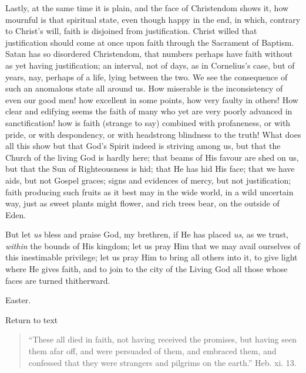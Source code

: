 Lastly, at the same time it is plain, and the face of Christendom
shows it, how mournful is that spiritual state, even though happy in
the end, in which, contrary to Christ's will, faith is disjoined from
justification. Christ willed that justification should come at once
upon faith through the Sacrament of Baptism. Satan has so disordered
Christendom, that numbers perhaps have faith without as yet having
justification; an interval, not of days, as in Cornelius's case, but
of years, nay, perhaps of a life, lying between the two. We see the
consequence of such an anomalous state all around us. How miserable is
the inconsistency of even our good men! how excellent in some points,
how very faulty in others! How clear and edifying seems the faith of
many who yet are very poorly advanced in sanctification! how is faith
(strange to say) combined with profaneness, or with pride, or with
despondency, or with headstrong blindness to the truth! What does all
this show but that God's Spirit indeed is striving among us, but that
the Church of the living God is hardly here; that beams of His favour
are shed on us, but that the Sun of Righteousness is hid; that He has
hid His face; that we have aids, but not Gospel graces; signs and
evidences of mercy, but not justification; faith producing such fruits
as it best may in the wide world, in a wild uncertain way, just as
sweet plants might flower, and rich trees bear, on the outside of
Eden.

But let \emph{us} bless and praise God, my brethren, if He has
placed \emph{us}, as we trust, \emph{within} the bounds of His
kingdom; let us pray Him that we may avail ourselves of this
inestimable privilege; let us pray Him to bring all others into it, to
give light where He gives faith, and to join to the city of the Living
God all those whose faces are turned thitherward.


Easter.

Return to text


\begin{quote}

``These all died in faith, not having received the promises,
but having seen them afar off, and were persuaded of them, and
embraced them, and confessed that they were strangers and pilgrims
on the earth.'' Heb. xi. 13.

\end{quote}

